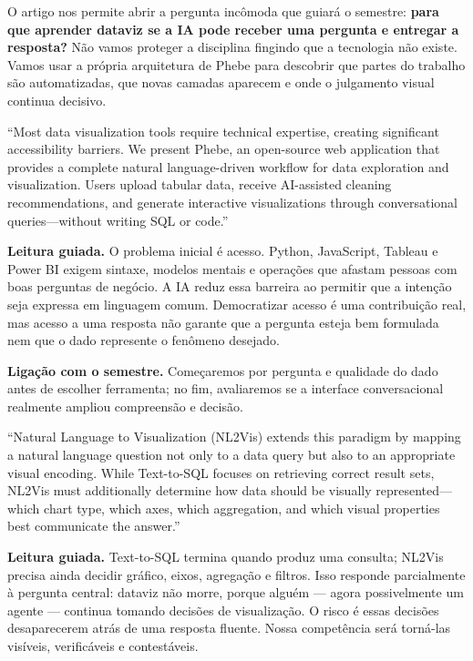 O artigo nos permite abrir a pergunta incômoda que guiará o semestre: \textbf{para que aprender dataviz se a IA pode receber uma pergunta e entregar a resposta?} Não vamos proteger a disciplina fingindo que a tecnologia não existe. Vamos usar a própria arquitetura de Phebe para descobrir que partes do trabalho são automatizadas, que novas camadas aparecem e onde o julgamento visual continua decisivo.

\begin{ArticleBox}
``Most data visualization tools require technical expertise, creating significant accessibility barriers. We present Phebe, an open-source web application that provides a complete natural language-driven workflow for data exploration and visualization. Users upload tabular data, receive AI-assisted cleaning recommendations, and generate interactive visualizations through conversational queries---without writing SQL or code.''
\end{ArticleBox}

\noindent\textbf{Leitura guiada.} O problema inicial é acesso. Python, JavaScript, Tableau e Power BI exigem sintaxe, modelos mentais e operações que afastam pessoas com boas perguntas de negócio. A IA reduz essa barreira ao permitir que a intenção seja expressa em linguagem comum. Democratizar acesso é uma contribuição real, mas acesso a uma resposta não garante que a pergunta esteja bem formulada nem que o dado represente o fenômeno desejado.

\noindent\textbf{Ligação com o semestre.} Começaremos por pergunta e qualidade do dado antes de escolher ferramenta; no fim, avaliaremos se a interface conversacional realmente ampliou compreensão e decisão.

\begin{ArticleBox}
``Natural Language to Visualization (NL2Vis) extends this paradigm by mapping a natural language question not only to a data query but also to an appropriate visual encoding. While Text-to-SQL focuses on retrieving correct result sets, NL2Vis must additionally determine how data should be visually represented---which chart type, which axes, which aggregation, and which visual properties best communicate the answer.''
\end{ArticleBox}

\noindent\textbf{Leitura guiada.} Text-to-SQL termina quando produz uma consulta; NL2Vis precisa ainda decidir gráfico, eixos, agregação e filtros. Isso responde parcialmente à pergunta central: dataviz não morre, porque alguém --- agora possivelmente um agente --- continua tomando decisões de visualização. O risco é essas decisões desaparecerem atrás de uma resposta fluente. Nossa competência será torná-las visíveis, verificáveis e contestáveis.

